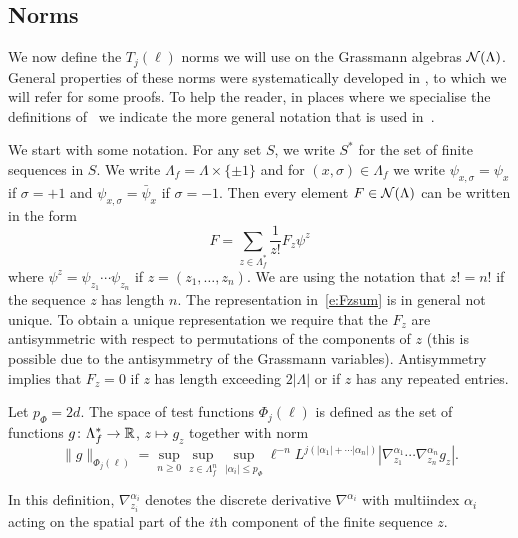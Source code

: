 \documentclass[11pt]{amsart}
\numberwithin{equation}{section}
\numberwithin{theorem}{section}
\newcommand{\1}{{\bf 1}}
\begin{document}
\subsection{Norms}
\label{sec:norms}

We now define the $T_j(\ell)$ norms we will use on the Grassmann algebras $\mathcal N(\Lambda)$.
General properties of these norms were systematically developed in \cite{MR3332938}, to which we will refer for some proofs.
To help the reader, in places where we specialise the definitions
of~\cite{MR3332938} we indicate the more general notation that is
used in~\cite{MR3332938}.

We start with some notation.
For any set $S$, we write $S^*$ for the set of finite sequences in $S$.
We write $\Lambda_f = \Lambda \times \{\pm 1\}$
and for $(x,\sigma) \in \Lambda_f$ we write $\psi_{x,\sigma} = \psi_x$ if $\sigma=+1$ and $\psi_{x,\sigma}=\bar\psi_x$ if $\sigma=-1$.
Then every element $F \in \mathcal N(\Lambda)$ can be written in the form
\begin{equation} \label{e:Fzsum}
  F = \sum_{z\in\Lambda_f^*} \frac{1}{z!}F_z \psi^z
\end{equation}
where $\psi^z = \psi_{z_1}\cdots \psi_{z_n}$ if $z=(z_1,\dots, z_n)$.
We are using the notation that $z!=n!$ if the sequence $z$ has length
$n$.  The representation in~\eqref{e:Fzsum} is in general not
unique. To obtain a unique representation we require that the $F_{z}$
are antisymmetric with respect to permutations of the components of
$z$ (this is possible due to the antisymmetry of the Grassmann variables).
Antisymmetry implies that $F_{z}=0$ if $z$ has length
exceeding $2|\Lambda|$ or if $z$ has any repeated entries. 



\begin{definition} \label{def:Phi}
  Let $p_{\Phi}=2d$.
  The space of test functions
  $\Phi_j(\ell)$ is defined as the set of functions
  $g\colon \Lambda_f^* \to \mathbb{R}$, $z\mapsto g_{z}$ together with
  norm
  \begin{equation} \label{e:Phi-def} \|g\|_{\Phi_j(\ell)} =
    \sup_{n\geq 0}\sup_{z\in\Lambda_f^n} \sup_{|\alpha_i| \leq  p_\Phi}
    \ell^{-n}L^{j(|\alpha_1|+\cdots|\alpha_n|)}|\nabla^{\alpha_1}_{z_1}
    \cdots \nabla^{\alpha_n}_{z_n} g_z|.
  \end{equation}
\end{definition}
In this definition, $\nabla_{z_i}^{\alpha_i}$ denotes the discrete
derivative $\nabla^{\alpha_i}$ with multiindex $\alpha_i$ acting on
the spatial part of the $i$th component of the finite sequence $z$.
\end{document}
